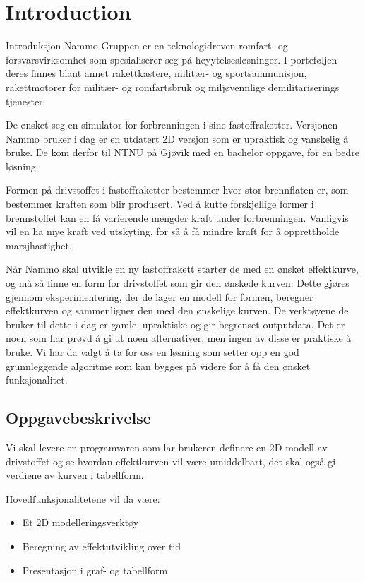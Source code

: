\chapter{Introduction}
\label{chap:introduksjon}

Introduksjon
Nammo Gruppen er en teknologidreven romfart- og forsvarsvirksomhet som spesialiserer seg på høyytelsesløsninger. I porteføljen deres finnes blant annet rakettkastere, militær- og sportsammunisjon, rakettmotorer for militær- og romfartsbruk og miljøvennlige demilitariserings tjenester.



De ønsket seg en simulator for forbrenningen i sine fastoffraketter. Versjonen Nammo bruker i dag er en utdatert 2D versjon som er upraktisk og vanskelig å bruke. De kom derfor til NTNU på Gjøvik med en bachelor oppgave, for en bedre løsning. 


Formen på drivstoffet i fastoffraketter bestemmer hvor stor brennflaten er, som bestemmer kraften som blir produsert. Ved å kutte forskjellige former i brennstoffet kan en få varierende mengder kraft under forbrenningen. Vanligvis vil en ha mye kraft ved utskyting, for så å få mindre kraft for å opprettholde marsjhastighet.


Når Nammo skal utvikle en ny fastoffrakett starter de med en ønsket effektkurve, og må så finne en form for drivstoffet som gir den ønskede kurven. Dette gjøres gjennom eksperimentering, der de lager en modell for formen, beregner effektkurven og sammenligner den med den ønskelige kurven. De verktøyene de bruker til dette i dag er gamle, upraktiske og gir begrenset outputdata. Det er noen som har prøvd å gi ut noen alternativer, men ingen av disse er praktiske å bruke. Vi har da valgt å ta for oss en løsning som setter opp en god grunnleggende algoritme som kan bygges på videre for å få den ønsket funksjonalitet.


\section{Oppgavebeskrivelse}


Vi skal levere en programvaren som lar brukeren definere en 2D modell av drivstoffet og se hvordan effektkurven vil være umiddelbart, det skal også gi verdiene av kurven i tabellform.

Hovedfunksjonalitetene vil da være:
\begin{itemize}
    \item  Et 2D modelleringsverktøy
    \item Beregning av effektutvikling over tid
    \item  Presentasjon i graf- og tabellform
\end{itemize}


